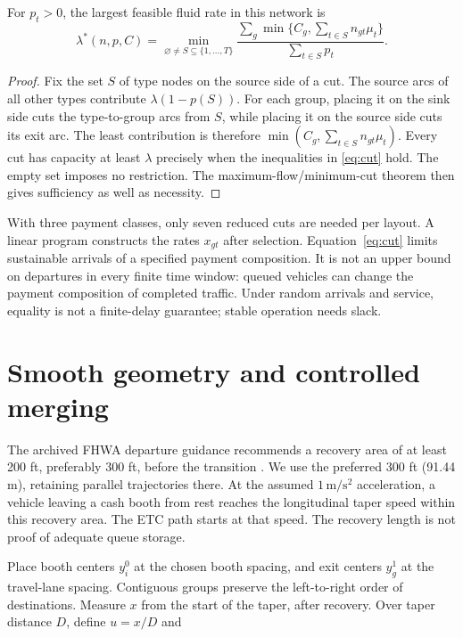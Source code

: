 \documentclass[12pt,letterpaper]{article}
\begin{document}
\begin{proposition}
For $p_t>0$, the largest feasible fluid rate in this network is
\begin{equation}
\lambda^*(n,p,C)=\min_{\varnothing\ne S\subseteq\{1,\ldots,T\}}
\frac{\sum_g\min\{C_g,\sum_{t\in S}n_{gt}\mu_t\}}{\sum_{t\in S}p_t}.\label{eq:cut}
\end{equation}
\end{proposition}
\begin{proof}
Fix the set $S$ of type nodes on the source side of a cut. The source arcs of all other types contribute $\lambda(1-p(S))$. For each group, placing it on the sink side cuts the type-to-group arcs from $S$, while placing it on the source side cuts its exit arc. The least contribution is therefore $\min(C_g,\sum_{t\in S}n_{gt}\mu_t)$. Every cut has capacity at least $\lambda$ precisely when the inequalities in \eqref{eq:cut} hold. The empty set imposes no restriction. The maximum-flow/minimum-cut theorem then gives sufficiency as well as necessity.
\end{proof}
With three payment classes, only seven reduced cuts are needed per layout. A linear program constructs the rates $x_{gt}$ after selection. Equation~\eqref{eq:cut} limits sustainable arrivals of a specified payment composition. It is not an upper bound on departures in every finite time window: queued vehicles can change the payment composition of completed traffic. Under random arrivals and service, equality is not a finite-delay guarantee; stable operation needs slack.

\section{Smooth geometry and controlled merging}
The archived FHWA departure guidance recommends a recovery area of at least 200 ft, preferably 300 ft, before the transition \cite{departure}. We use the preferred 300 ft (91.44 m), retaining parallel trajectories there. At the assumed $1\,\mathrm{m/s^2}$ acceleration, a vehicle leaving a cash booth from rest reaches the longitudinal taper speed within this recovery area. The ETC path starts at that speed. The recovery length is not proof of adequate queue storage.

Place booth centers $y_i^0$ at the chosen booth spacing, and exit centers $y_g^1$ at the travel-lane spacing. Contiguous groups preserve the left-to-right order of destinations. Measure $x$ from the start of the taper, after recovery. Over taper distance $D$, define $u=x/D$ and
\end{document}
